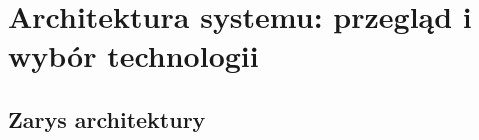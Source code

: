 \chapter{ Architektura systemu: przegląd i wybór technologii }

\section{Zarys architektury}










		
